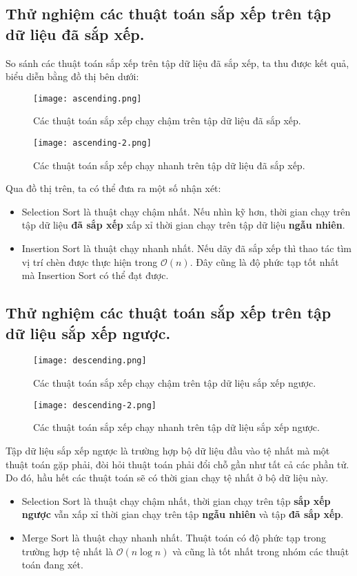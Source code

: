 \documentclass[]{article}
\begin{document}
\subsection{Thử nghiệm các thuật toán sắp xếp trên tập dữ liệu đã sắp xếp.}
So sánh các thuật toán sắp xếp trên tập dữ liệu đã sắp xếp, ta thu được kết quả, biểu diễn bằng đồ thị bên dưới:
\begin{figure}[H]
\centering
\texttt{[image: ascending.png]}
\caption{Các thuật toán sắp xếp chạy chậm trên tập dữ liệu đã sắp xếp.}
\end{figure}
\begin{figure}[H]
\centering
\texttt{[image: ascending-2.png]}
\caption{Các thuật toán sắp xếp chạy nhanh trên tập dữ liệu đã sắp xếp.}
\end{figure}
Qua đồ thị trên, ta có thể đưa ra một số nhận xét:
\begin{itemize}
\item Selection Sort là thuật chạy chậm nhất. Nếu nhìn kỹ hơn, thời gian chạy trên tập dữ liệu \textbf{đã sắp xếp} xấp xỉ thời gian chạy trên tập dữ liệu \textbf{ngẫu nhiên}.
\item Insertion Sort là thuật chạy nhanh nhất. Nếu dãy đã sắp xếp thì thao tác tìm vị trí chèn được thực hiện trong $\mathcal{O}(n)$. Đây cũng là độ phức tạp tốt nhất mà Insertion Sort có thể đạt được.
\end{itemize}

\subsection{Thử nghiệm các thuật toán sắp xếp trên tập dữ liệu sắp xếp ngược.}
\begin{figure}[H]
\centering
\texttt{[image: descending.png]}
\caption{Các thuật toán sắp xếp chạy chậm trên tập dữ liệu sắp xếp ngược.}
\end{figure}
\begin{figure}[H]
\centering
\texttt{[image: descending-2.png]}
\caption{Các thuật toán sắp xếp chạy nhanh trên tập dữ liệu sắp xếp ngược.}
\end{figure}
Tập dữ liệu sắp xếp ngược là trường hợp bộ dữ liệu đầu vào tệ nhất mà một thuật toán gặp phải, đòi hỏi thuật toán phải đổi chỗ gần như tất cả các phần tử. Do đó, hầu hết các thuật toán sẽ có thời gian chạy tệ nhất ở bộ dữ liệu này.
\begin{itemize}
\item Selection Sort là thuật chạy chậm nhất, thời gian chạy trên tập \textbf{sắp xếp ngược} vẫn xấp xỉ thời gian chạy trên tập \textbf{ngẫu nhiên} và tập \textbf{đã sắp xếp}.
\item Merge Sort là thuật chạy nhanh nhất. Thuật toán có độ phức tạp trong trường hợp tệ nhất là $\mathcal{O}(n \log n)$ và cũng là tốt nhất trong nhóm các thuật toán đang xét.
\end{itemize}
\end{document}
